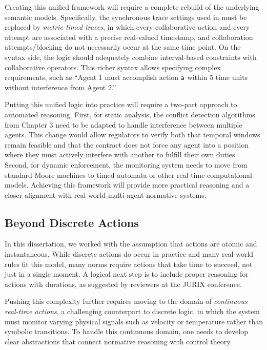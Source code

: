 Creating this unified framework will require a complete rebuild of the underlying semantic models. Specifically, the synchronous trace settings used in \cDL must be replaced by \emph{metric-timed traces}, in which every collaborative action and every attempt are associated with a precise real-valued timestamp, and collaboration attempts/blocking do not necessarily occur at the same time point. On the syntax side, the logic should adequately combine interval-based constraints with collaborative operators. This richer syntax allows specifying complex requirements, such as ``Agent 1 must accomplish action $\mathsf{a} $ within 5 time units without interference from Agent 2.''

Putting this unified logic into practice will require a two-part approach to automated reasoning. First, for static analysis, the conflict detection algorithms from Chapter 3 need to be adapted to handle interference between multiple agents. This change would allow regulators to verify both that temporal windows remain feasible and that the contract does not force any agent into a position where they must actively interfere with another to fulfill their own duties. Second, for dynamic enforcement, the monitoring system needs to move from standard Moore machines to timed automata or other real-time computational models. Achieving this framework will provide more practical reasoning and a closer alignment with real-world multi-agent normative systems.

\subsection{Beyond Discrete Actions}
In this dissertation, we worked with the assumption that actions are atomic and instantaneous. While discrete actions do occur in practice and many real-world rules fit this model, many norms require actions that take time to succeed, not just in a single moment. A logical next step is to include proper reasoning for actions with durations, as suggested by reviewers at the JURIX conference.

Pushing this complexity further requires moving to the domain of \emph{continuous real-time actions}, a challenging counterpart to discrete logic, in which the system must monitor varying physical signals such as velocity or temperature rather than symbolic transitions. To handle this continuous domain, one needs to develop clear abstractions that connect normative reasoning with control theory.

